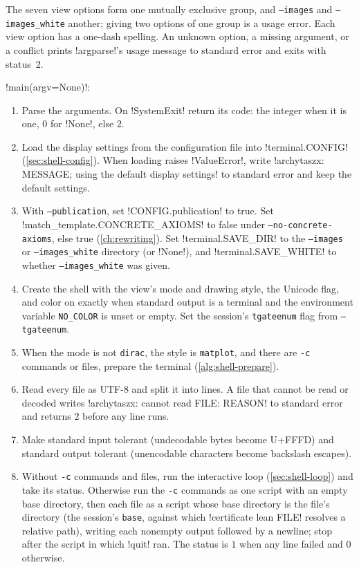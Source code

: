The seven view options form one mutually exclusive group, and \texttt{--images} and \texttt{--images\_white} another; giving two options of one group is a usage error. Each view option has a one-dash spelling. An unknown option, a missing argument, or a conflict prints \py!argparse!'s usage message to standard error and exits with status~2.

\begin{algorithm}[Startup]\label{alg:shell-main}
\leavevmode
\py!main(argv=None)!:
\begin{enumerate}
\item Parse the arguments. On \py!SystemExit! return its code: the integer when it is one, $0$ for \py!None!, else $2$.
\item Load the display settings from the configuration file into \py!terminal.CONFIG! (\cref{sec:shell-config}). When loading raises \py!ValueError!, write \code!archytaszx: MESSAGE; using the default display settings! to standard error and keep the default settings.
\item With \texttt{--publication}, set \py!CONFIG.publication! to true. Set \py!match_template.CONCRETE_AXIOMS! to false under \texttt{--no-concrete-axioms}, else true (\cref{ch:rewriting}). Set \py!terminal.SAVE_DIR! to the \texttt{--images} or \texttt{--images\_white} directory (or \py!None!), and \py!terminal.SAVE_WHITE! to whether \texttt{--images\_white} was given.
\item Create the shell with the view's mode and drawing style, the Unicode flag, and color on exactly when standard output is a terminal and the environment variable \texttt{NO\_COLOR} is unset or empty. Set the session's \texttt{tgateenum} flag from \texttt{--tgateenum}.
\item When the mode is not \texttt{dirac}, the style is \texttt{matplot}, and there are \texttt{-c} commands or files, prepare the terminal (\cref{alg:shell-prepare}).
\item Read every file as UTF-8 and split it into lines. A file that cannot be read or decoded writes \code!archytaszx: cannot read FILE: REASON! to standard error and returns $2$ before any line runs.
\item Make standard input tolerant (undecodable bytes become U+FFFD) and standard output tolerant (unencodable characters become backslash escapes).
\item Without \texttt{-c} commands and files, run the interactive loop (\cref{sec:shell-loop}) and take its status. Otherwise run the \texttt{-c} commands as one script with an empty base directory, then each file as a script whose base directory is the file's directory (the session's \texttt{base}, against which \azx!certificate lean FILE! resolves a relative path), writing each nonempty output followed by a newline; stop after the script in which \azx!quit! ran. The status is $1$ when any line failed and $0$ otherwise.

\end{enumerate}
\end{algorithm}
